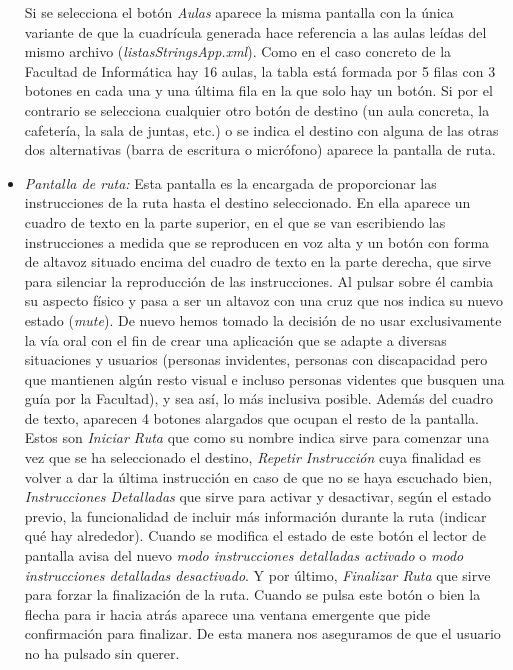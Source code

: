 \begin{itemize}
	Si se selecciona el botón \textit{Aulas} aparece la misma pantalla con la única variante de que la cuadrícula generada hace referencia a las aulas leídas del mismo archivo (\textit{listasStringsApp.xml}). Como en el caso concreto de la Facultad de Informática hay 16 aulas, la tabla está formada por 5 filas con 3 botones en cada una y una última fila en la que solo hay un botón. Si por el contrario se selecciona cualquier otro botón de destino (un aula concreta, la cafetería, la sala de juntas, etc.) o se indica el destino con alguna de las otras dos alternativas (barra de escritura o micrófono) aparece la pantalla de ruta.
	
	\item \textit{Pantalla de ruta:} Esta pantalla es la encargada de proporcionar las instrucciones de la ruta hasta el destino seleccionado. En ella aparece un cuadro de texto en la parte superior, en el que se van escribiendo las instrucciones a medida que se reproducen en voz alta y un botón con forma de altavoz situado encima del cuadro de texto en la parte derecha, que sirve para silenciar la reproducción de las instrucciones. Al pulsar sobre él cambia su aspecto físico y pasa a ser un altavoz con una cruz que nos indica su nuevo estado (\textit{mute}). De nuevo hemos tomado la decisión de no usar exclusivamente la vía oral con el fin de crear una aplicación que se adapte a diversas situaciones y usuarios (personas invidentes, personas con discapacidad pero que mantienen algún resto visual e incluso personas videntes que busquen una guía por la Facultad), y sea así, lo más inclusiva posible. Además del cuadro de texto, aparecen 4 botones alargados que ocupan el resto de la pantalla. Estos son \textit{Iniciar Ruta} que como su nombre indica sirve para comenzar una vez que se ha seleccionado el destino, \textit{Repetir Instrucción} cuya finalidad es volver a dar la última instrucción en caso de que no se haya escuchado bien, \textit{Instrucciones Detalladas} que sirve para activar y desactivar, según el estado previo, la funcionalidad de incluir más información durante la ruta (indicar qué hay alrededor). Cuando se modifica el estado de este botón el lector de pantalla avisa del nuevo \textit{modo instrucciones detalladas activado} o \textit{modo instrucciones detalladas desactivado}. Y por último, \textit{Finalizar Ruta} que sirve para forzar la finalización de la ruta. Cuando se pulsa este botón o bien la flecha para ir hacia atrás aparece una ventana emergente que pide confirmación para finalizar. De esta manera nos aseguramos de que el usuario no ha pulsado sin querer. 
	

\end{itemize}
